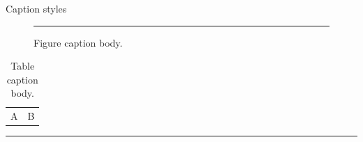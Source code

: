 \documentclass[language=english,cjk=true]{campusbeamer}
\begin{document}
\begin{frame}{Caption styles}
\begin{figure}
\rule{20pt}{8pt}
\caption{Figure caption body.}
\end{figure}
\begin{table}
\begin{tabular}{cc}A & B\end{tabular}
\caption{Table caption body.}
\end{table}
\centering\rule{20pt}{8pt}
\campusvideocaption{}
\end{frame}
\end{document}
